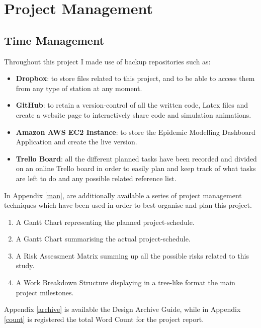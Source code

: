 \chapter{Project Management}

\label{ch:management}
\setlength\lineskip{0pt}
\vspace*{15pt}

\section{Time Management}
Throughout this project I made use of backup repositories such as:

\begin{itemize}
\itemsep0em
\item \textbf{Dropbox}: to store files related to this project, and to be able to access them from any type of station at any moment.
\item \textbf{GitHub}: to retain a version-control of all the written code, Latex files and create a website page to interactively share code and simulation animations.
\item \textbf{Amazon AWS EC2 Instance}: to store the Epidemic Modelling Dashboard Application and create the live version.
\item \textbf{Trello Board}: all the different planned tasks have been recorded and divided on an online Trello board in order to easily plan and keep track of what tasks are left to do and any possible related reference list.
\end{itemize}

In Appendix \ref{man}, are additionally available a series of project management techniques which have been used in order to best organise and plan this project.

\begin{enumerate}
\itemsep0em
\item A Gantt Chart representing the planned project-schedule.
\item A Gantt Chart summarising the actual project-schedule.
\item A Risk Assessment Matrix summing up all the possible risks related to this study.
\item A Work Breakdown Structure displaying in a tree-like format the main project milestones. 
\end{enumerate}

Appendix \ref{archive} is available the Design Archive Guide, while in Appendix \ref{count} is registered the total Word Count for the project report.


